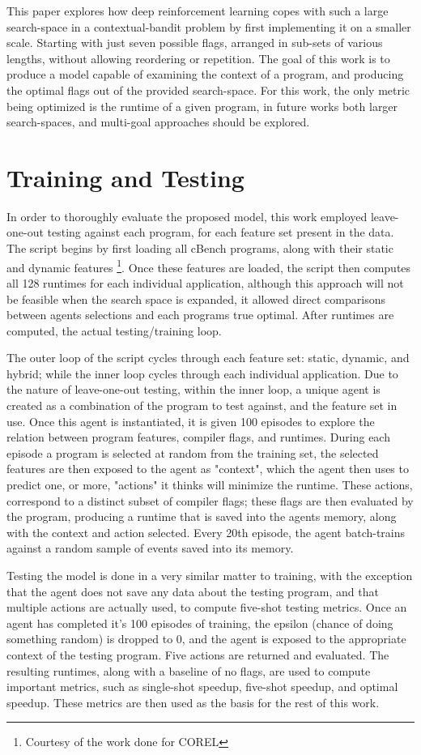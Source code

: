 \documentclass{article}
\begin{document}
This paper explores how deep reinforcement learning copes with such a large search-space in a contextual-bandit problem by first implementing it on a smaller scale. Starting with just seven possible flags, arranged in sub-sets of various lengths, without allowing reordering or repetition. The goal of this work is to produce a model capable of examining the context of a program, and producing the optimal flags out of the provided search-space. For this work, the only metric being optimized is the runtime of a given program, in future works both larger search-spaces, and multi-goal approaches should be explored.


\section{Training and Testing}
In order to thoroughly evaluate the proposed model, this work employed leave-one-out testing against each program, for each feature set present in the data. The script begins by first loading all cBench programs, along with their static and dynamic features \footnote{Courtesy of the work done for COREL}. Once these features are loaded, the script then computes all 128 runtimes for each individual application, although this approach will not be feasible when the search space is expanded, it allowed direct comparisons between agents selections and each programs true optimal. After runtimes are computed, the actual testing/training loop.

The outer loop of the script cycles through each feature set: static, dynamic, and hybrid; while the inner loop cycles through each individual application. Due to the nature of leave-one-out testing, within the inner loop, a unique agent is created as a combination of the program to test against, and the feature set in use. Once this agent is instantiated, it is given 100 episodes to explore the relation between program features, compiler flags, and runtimes. During each episode a program is selected at random from the training set, the selected features are then exposed to the agent as "context", which the agent then uses to predict one, or more, "actions" it thinks will minimize the runtime. These actions, correspond to a distinct subset of compiler flags; these flags are then evaluated by the program, producing a runtime that is saved into the agents memory, along with the context and action selected. Every 20th episode, the agent batch-trains against a random sample of events saved into its memory.

Testing the model is done in a very similar matter to training, with the exception that the agent does not save any data about the testing program, and that multiple actions are actually used, to compute five-shot testing metrics. Once an agent has completed it's 100 episodes of training, the epsilon (chance of doing something random) is dropped to 0, and the agent is exposed to the appropriate context of the testing program. Five actions are returned and evaluated. The resulting runtimes, along with a baseline of no flags, are used to compute important metrics, such as single-shot speedup, five-shot speedup, and optimal speedup. These metrics are then used as the basis for the rest of this work. 
\end{document}
